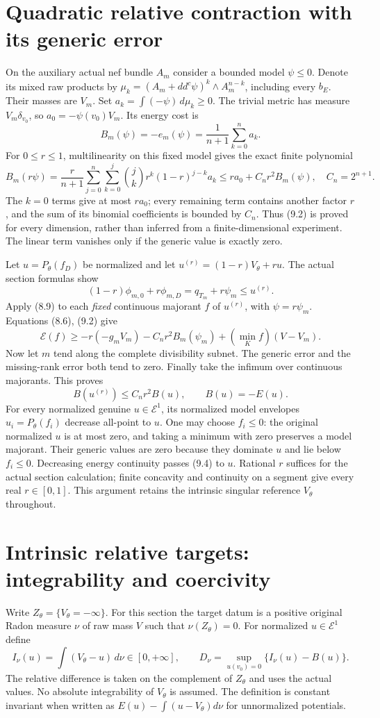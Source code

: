 \documentclass[10pt]{article}
\newcommand{\E}{\mathcal E}
\begin{document}
\section{Quadratic relative contraction with its generic error}
On the auxiliary actual nef bundle $A_m$ consider a bounded model
$\psi\leq0$. Denote its mixed raw products by
$\mu_k=(A_m+dd^c\psi)^k\wedge A_m^{n-k}$, including every $b_E$.
Their masses are $V_m$. Set $a_k=\int(-\psi)\,d\mu_k\geq0$. The trivial
metric has measure $V_m\delta_{v_0}$, so
$a_0=-\psi(v_0)V_m$. Its energy cost is
\[
 B_m(\psi)=-e_m(\psi)=\frac{1}{n+1}\sum_{k=0}^n a_k.  \tag{9.1}
\]
For $0\leq r\leq1$, multilinearity on this fixed model gives the exact
finite polynomial
\[
 B_m(r\psi)=\frac r{n+1}\sum_{j=0}^n\sum_{k=0}^j
             {j\choose k}r^k(1-r)^{j-k}a_k
 \leq r a_0+C_n r^2B_m(\psi),\quad C_n=2^{n+1}.     \tag{9.2}
\]
The $k=0$ terms give at most $ra_0$; every remaining term contains another
factor $r$, and the sum of its binomial coefficients is bounded by
$C_n$. Thus (9.2) is proved for every dimension, rather than inferred from
a finite-dimensional experiment. The linear term vanishes only if the
generic value is exactly zero.

Let $u=P_\theta(f_D)$ be normalized and let
$u^{(r)}=(1-r)V_\theta+ru$. The actual section formulas show
\[
 (1-r)\phi_{m,0}+r\phi_{m,D}=q_{T_m}+r\psi_m\leq u^{(r)}. 
\]
Apply (8.9) to each \emph{fixed} continuous majorant $f$ of $u^{(r)}$,
with $\psi=r\psi_m$. Equations (8.6), (9.2) give
\[
 \mathscr E(f)\geq
   -r(-g_mV_m)-C_nr^2B_m(\psi_m)+(\min_K f)(V-V_m).
                                                               \tag{9.3}
\]
Now let $m$ tend along the complete divisibility subnet. The generic
error and the missing-rank error both tend to zero. Finally take the
infimum over continuous majorants. This proves
\[
 B(u^{(r)})\leq C_nr^2B(u),\qquad B(u)=-E(u).        \tag{9.4}
\]
For every normalized genuine $u\in\E^1$, its normalized model envelopes
$u_i=P_\theta(f_i)$ decrease all-point to $u$. One may choose $f_i\leq0$:
the original normalized $u$ is at most zero, and taking a minimum with
zero preserves a model majorant. Their generic values are zero because
they dominate $u$ and lie below $f_i\leq0$. Decreasing energy continuity
passes (9.4) to $u$. Rational $r$ suffices for the actual section
calculation; finite concavity and continuity on a segment give every real
$r\in[0,1]$. This argument retains the intrinsic singular reference
$V_\theta$ throughout.

\section{Intrinsic relative targets: integrability and coercivity}
Write $Z_\theta=\{V_\theta=-\infty\}$. For this section the target datum is
a positive original Radon measure $\nu$ of raw mass $V$ such that
$\nu(Z_\theta)=0$. For normalized $u\in\E^1$ define
\[
 I_\nu(u)=\int(V_\theta-u)\,d\nu\in[0,+\infty],\qquad
 D_\nu=\sup_{u(v_0)=0}\{I_\nu(u)-B(u)\}.             \tag{10.1}
\]
The relative difference is taken on the complement of $Z_\theta$ and
uses the actual values. No absolute integrability of $V_\theta$ is assumed.
The definition is constant invariant when written as
$E(u)-\int(u-V_\theta)d\nu$ for unnormalized potentials.
\end{document}
